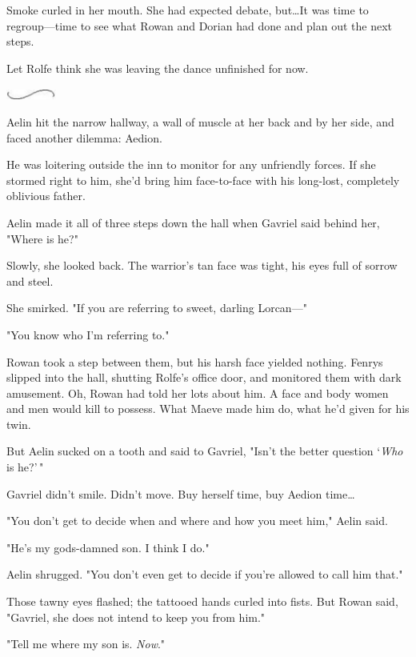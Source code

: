 Smoke curled in her mouth.
She had expected debate, but\ldots It was time to regroup---time to see what Rowan and Dorian had done and plan out the next steps.

Let Rolfe think she was leaving the dance unfinished for now.

\begin{center}
	\includegraphics[width=0.65in,height=0.13in]{images/seperator}
\end{center}

Aelin hit the narrow hallway, a wall of muscle at her back and by her side, and faced another dilemma: Aedion.

He was loitering outside the inn to monitor for any unfriendly forces.
If she stormed right to him, she'd bring him face-to-face with his long-lost, completely oblivious father.

Aelin made it all of three steps down the hall when Gavriel said behind her, "Where is he?"

Slowly, she looked back.
The warrior's tan face was tight, his eyes full of sorrow and steel.

She smirked.
"If you are referring to sweet, darling Lorcan---"

"You know who I'm referring to."

Rowan took a step between them, but his harsh face yielded nothing.
Fenrys slipped into the hall, shutting Rolfe's office door, and monitored them with dark amusement.
Oh, Rowan had told her lots about him.
A face and body women and men would kill to possess.
What Maeve made him do, what he'd given for his twin.

But Aelin sucked on a tooth and said to Gavriel, "Isn't the better question `\emph{Who} is he?'\,"

Gavriel didn't smile.
Didn't move.
Buy herself time, buy Aedion time\ldots{}

"You don't get to decide when and where and how you meet him," Aelin said.

"He's my gods-damned son.
I think I do."

Aelin shrugged.
"You don't even get to decide if you're allowed to call him that."

Those tawny eyes flashed; the tattooed hands curled into fists.
But Rowan said, "Gavriel, she does not intend to keep you from him."

"Tell me where my son is.
\emph{Now}."

